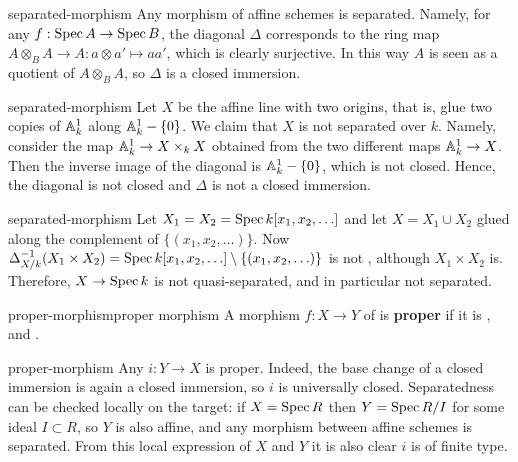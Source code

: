\begin{example}{separated-morphism}
    Any morphism of affine schemes is separated. Namely, for any $f : \Spec A \to \Spec B$, the diagonal $\Delta$ corresponds to the ring map $A \otimes_B A \to A : a \otimes a' \mapsto aa'$, which is clearly surjective. In this way $A$ is seen as a quotient of $A \otimes_B A$, so $\Delta$ is a closed immersion.
\end{example}

\begin{example}{separated-morphism}
    Let $X$ be the affine line with two origins, that is, glue two copies of $\AA_k^1$ along $\AA_k^1 - \{ 0 \}$. We claim that $X$ is not separated over $k$. Namely, consider the map $\AA^1_k \to X \times_k X$ obtained from the two different maps $\AA_k^1 \to X$. Then the inverse image of the diagonal is $\AA_k^1 - \{ 0 \}$, which is not closed. Hence, the diagonal is not closed and $\Delta$ is not a closed immersion.
\end{example}

\begin{example}{separated-morphism}
    Let $X_1 = X_2 = \Spec k[x_1, x_2, \ldots]$ and let $X = X_1 \cup X_2$ glued along the complement of $\{ (x_1, x_2, \ldots) \}$. Now $\Delta_{X/k}^{-1}(X_1 \times X_2) = \Spec k[x_1, x_2, \ldots] \setminus \{ (x_1, x_2, \ldots) \}$ is not , although $X_1 \times X_2$ is. Therefore, $X \to \Spec k$ is not quasi-separated, and in particular not separated.
\end{example}

\begin{topic}{proper-morphism}{proper morphism}
    A morphism $f : X \to Y$ of  is \textbf{proper} if it is ,  and .
\end{topic}

\begin{example}{proper-morphism}
    Any  $i : Y \to X$ is proper. Indeed, the base change of a closed immersion is again a closed immersion, so $i$ is universally closed. Separatedness can be checked locally on the target: if $X = \Spec R$ then $Y = \Spec R / I$ for some ideal $I \subset R$, so $Y$ is also affine, and any morphism between affine schemes is separated. From this local expression of $X$ and $Y$ it is also clear $i$ is of finite type.
\end{example}

